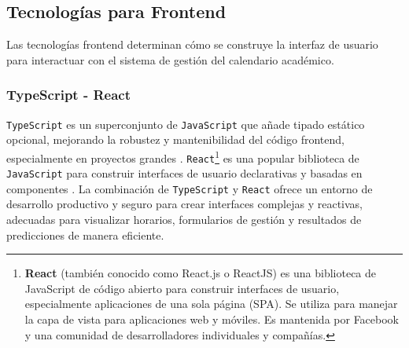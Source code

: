 \subsection{Tecnologías para Frontend}
Las tecnologías frontend determinan cómo se construye la interfaz de usuario para interactuar con el sistema de gestión del calendario académico.

\subsubsection{TypeScript - React}
\texttt{TypeScript} es un superconjunto de \texttt{JavaScript} que añade tipado estático opcional, mejorando la robustez y mantenibilidad del código frontend, especialmente en proyectos grandes \parencite{MicrosoftTypeScript}. \texttt{React}\footnote{\textbf{React} (también conocido como React.js o ReactJS) es una biblioteca de JavaScript de código abierto para construir interfaces de usuario, especialmente aplicaciones de una sola página (SPA).
Se utiliza para manejar la capa de vista para aplicaciones web y móviles.
Es mantenida por Facebook y una comunidad de desarrolladores individuales y compañías.} es una popular biblioteca de \texttt{JavaScript} para construir interfaces de usuario declarativas y basadas en componentes \parencite{FacebookReact}.
La combinación de \texttt{TypeScript} y \texttt{React} ofrece un entorno de desarrollo productivo y seguro para crear interfaces complejas y reactivas, adecuadas para visualizar horarios, formularios de gestión y resultados de predicciones de manera eficiente.
